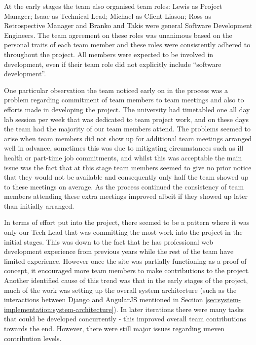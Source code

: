 \documentclass{l3proj}
\begin{document}
At the early stages the team also organised team roles: Lewis as Project Manager; Isaac as Technical Lead; Michael as Client Liason; Ross as Retrospective Manager and Branko and Takis were general Software Development Engineers. The team agreement on these roles was unanimous based on the personal traits of each team member and these roles were consistently adhered to throughout the project. All members were expected to be involved in development, even if their team role did not explicitly include ``software development''.

One particular observation the team noticed early on in the process was a problem regarding commitment of team members to team meetings and also to efforts made in developing the project. The university had timetabled one all day lab session per week that was dedicated to team project work, and on these days the team had the majority of our team members attend. The problems seemed to arise when team members did not show up for additional team meetings arranged well in advance, sometimes this was due to mitigating circumstances such as ill health or part-time job commitments, and whilst this was acceptable the main issue was the fact that at this stage team members seemed to give no prior notice that they would not be available and consequently only half the team showed up to these meetings on average. As the process continued the consistency of team members attending these extra meetings improved albeit if they showed up later than initially arranged.

In terms of effort put into the project, there seemed to be a pattern where it was only our Tech Lead that was committing the most work into the project in the initial stages. This was down to the fact that he has professional web development experience from previous years while the rest of the team have limited experience. However once the site was partially functioning as a proof of concept, it encouraged more team members to make contributions to the project. Another identified cause of this trend was that in the early stages of the project, much of the work was setting up the overall system architecture (such as the interactions between Django and AngularJS mentioned in Section \ref{sec:system-implementation:system-architecture}). In later iterations there were many tasks that could be developed concurrently - this improved overall team contributions towards the end. However, there were still major issues regarding uneven contribution levels.

\end{document}
